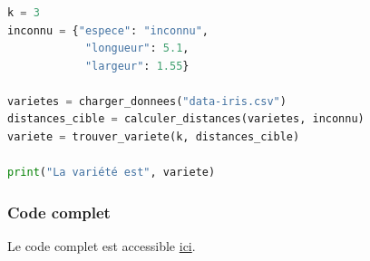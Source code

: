 \documentclass[svgnames,11pt]{beamer}
\begin{document}
\begin{frame}[fragile]
    \frametitle{}

    \begin{center}
        \begin{lstlisting}[language=Python , basicstyle=\ttfamily\small, xleftmargin=0.2em, xrightmargin=-2em]
k = 3
inconnu = {"espece": "inconnu", 
            "longueur": 5.1, 
            "largeur": 1.55}

varietes = charger_donnees("data-iris.csv")
distances_cible = calculer_distances(varietes, inconnu)
variete = trouver_variete(k, distances_cible)

print("La variété est", variete)
\end{lstlisting}
    \end{center}

\end{frame}
\begin{frame}
    \frametitle{Code complet}

    Le code complet est accessible \href{https://cviroulaud.github.io/premiere/algorithmique/knn/iris/scripts/iris-correction.zip}{ici}.

\end{frame}
\end{document}
